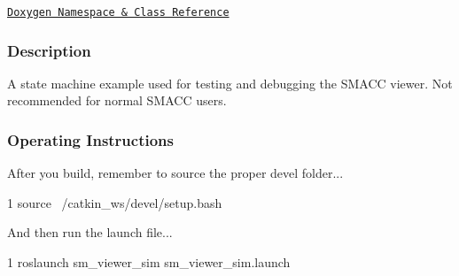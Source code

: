 \href{https://reelrbtx.github.io/SMACC/master/html/namespacesm__viewer__sim.html}{\tt Doxygen Namespace \& Class Reference}

\subsubsection*{Description}

A state machine example used for testing and debugging the S\+M\+A\+CC viewer. Not recommended for normal S\+M\+A\+CC users. \subsubsection*{Operating Instructions}

After you build, remember to source the proper devel folder...


\begin{DoxyCode}
1 source ~/catkin\_ws/devel/setup.bash
\end{DoxyCode}


And then run the launch file...


\begin{DoxyCode}
1 roslaunch sm\_viewer\_sim sm\_viewer\_sim.launch
\end{DoxyCode}
 